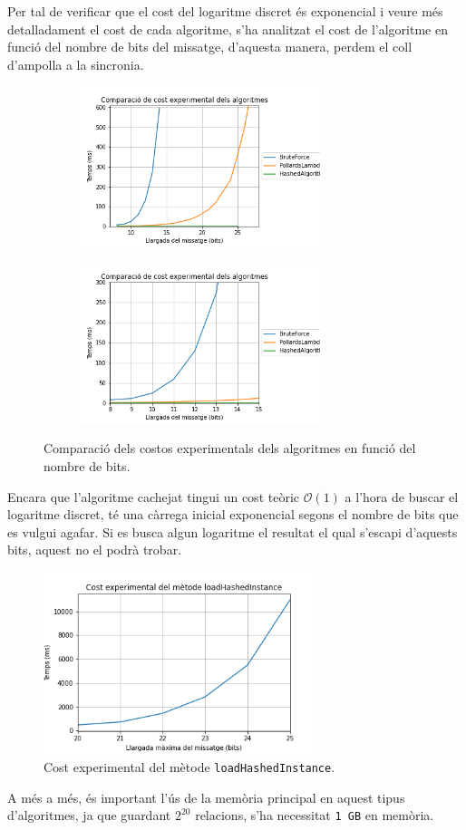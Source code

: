Per tal de verificar que el cost del logaritme discret és exponencial i veure més detalladament el cost de cada algoritme, s'ha analitzat el cost de l'algoritme en funció del nombre de bits del missatge, d'aquesta manera, perdem el coll d'ampolla a la sincronia.
\begin{figure}[H]
	\centering
	\begin{subfigure}[b]{0.48\textwidth}
		\centering
		\includegraphics[width=7cm]{imgs/cost/algoritmes-cost.png}
	\end{subfigure}
	\begin{subfigure}[b]{0.48\textwidth}
	\centering
	\includegraphics[width=7cm]{imgs/cost/algoritmes-cost2.png}
	\end{subfigure}
	\caption{Comparació dels costos experimentals dels algoritmes en funció del nombre de bits.}
	\label{fig:cost-algo}
\end{figure}
Encara que l'algoritme cachejat tingui un cost teòric $\mathcal{O}(1)$ a l'hora de buscar el logaritme discret, té una càrrega inicial exponencial segons el nombre de bits que es vulgui agafar. Si es busca algun logaritme el resultat el qual s'escapi d'aquests bits, aquest no el podrà trobar.
\begin{figure}[H]
	\centering
	\includegraphics[width=8cm]{imgs/cost/pollardslambda.png}
	\caption{Cost experimental del mètode \texttt{loadHashedInstance}.}
	\label{fig:pollardslambda}
\end{figure}
A més a més, és important l'ús de la memòria principal en aquest tipus d'algoritmes, ja que guardant $2^{20}$ relacions, s'ha necessitat \texttt{1 GB} en memòria.
